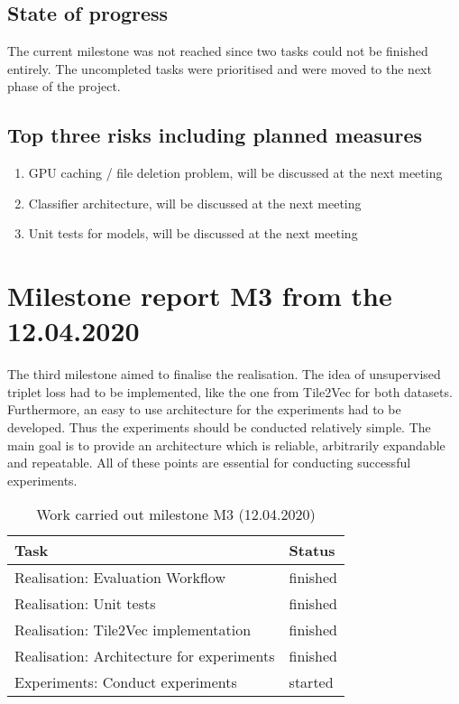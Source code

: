 \subsection{State of progress}
The current milestone was not reached since two tasks could not be finished entirely. The uncompleted tasks were prioritised and were moved to the next phase of the project.

\subsection{Top three risks including planned measures}
\begin{enumerate}
    \setlength\itemsep{0em}
    \item GPU caching / file deletion problem, will be discussed at the next meeting
    \item Classifier architecture, will be discussed at the next meeting
    \item Unit tests for models, will be discussed at the next meeting 
\end{enumerate}

\section{Milestone report M3 from the 12.04.2020}
The third milestone aimed to finalise the realisation. The idea of unsupervised triplet loss had to be implemented, like the one from Tile2Vec for both datasets. Furthermore, an easy to use architecture for the experiments had to be developed. Thus the experiments should be conducted relatively simple. The main goal is to provide an architecture which is reliable, arbitrarily expandable and repeatable. All of these points are essential for conducting successful experiments.

\begin{table}[htbp]
    \centering
    \caption{Work carried out milestone M3 (12.04.2020)}
	\label{tab:Work-Carried-Out-M3}
    \begin{tabular}{p{} | p{}}
        \toprule
        \textbf{Task} & \textbf{Status} \\ 
        \midrule[1pt]
        Realisation: Evaluation Workflow & finished \\
        \hline
        Realisation: Unit tests & finished \\
        \hline
        Realisation: Tile2Vec implementation & finished \\
        \hline
        Realisation: Architecture for experiments & finished \\
        \hline
        Experiments: Conduct experiments & started \\
        \bottomrule
    \end{tabular}
\end{table}

